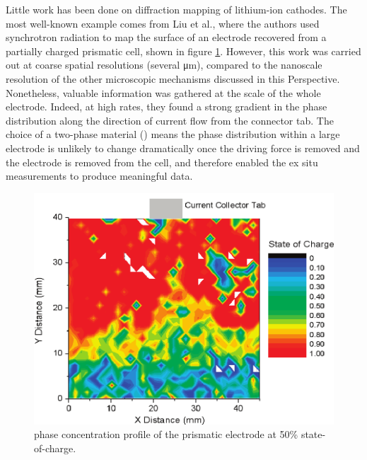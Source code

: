 \documentclass[journal=cmatex,manuscript=perspective]{achemso}
\begin{document}
Little work has been done on diffraction mapping of lithium-ion
cathodes. The most well-known example comes from Liu et
al.\cite{liu2010}, where the authors used synchrotron radiation to map
the surface of an electrode recovered from a partially charged
prismatic cell, shown in figure \ref{figure:liu2010}. However, this
work was carried out at coarse spatial resolutions (several
\si{\micro\meter}), compared to the nanoscale resolution of the other
microscopic mechanisms discussed in this Perspective. Nonetheless,
valuable information was gathered at the scale of the whole
electrode. Indeed, at high rates, they found a strong gradient in the
phase distribution along the direction of current flow from the
connector tab. The choice of a two-phase material () means
the phase distribution within a large electrode is unlikely to change
dramatically once the driving force is removed and the electrode is
removed from the cell, and therefore enabled the ex situ measurements
to produce meaningful data.

\begin{figure}
  \includegraphics[width=\textwidth]{liu2010.png}
  \caption{ phase concentration profile of the prismatic
    electrode at 50\% state-of-charge.\cite{liu2010}}
  \label{figure:liu2010}
\end{figure}
\end{document}
